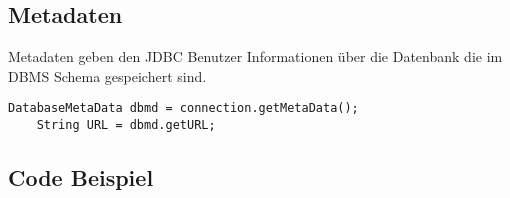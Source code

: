 \subsection{Metadaten}
Metadaten geben den JDBC Benutzer Informationen über die Datenbank die im DBMS Schema gespeichert sind.
\begin{lstlisting}[style=Java]
    DatabaseMetaData dbmd = connection.getMetaData();
    String URL = dbmd.getURL;
\end{lstlisting}

\subsection{Code Beispiel}

